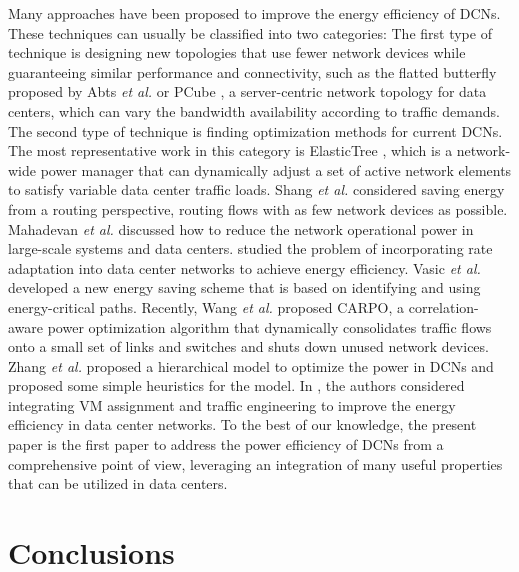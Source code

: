 \documentclass[journal,single-space,two column,twoside,10pt]{IEEEtran}
\begin{document}
Many approaches have been proposed to improve the energy efficiency of DCNs. These techniques can usually be classified into two categories: The first type of technique is designing new topologies that use fewer network devices while guaranteeing similar performance and connectivity, such as the flatted butterfly proposed by Abts \emph{et al.} \cite{Abts_Marty-2010} or PCube \cite{Huang_Jia-2011}, a server-centric network topology for data centers, which can vary the bandwidth availability according to traffic demands. The second type of technique is finding optimization methods for current DCNs. The most representative work in this category is ElasticTree \cite{Heller_Seetharaman-2010}, which is a network-wide power manager that can dynamically adjust a set of active network elements to satisfy variable data center traffic loads. Shang \emph{et al.} \cite{Shang_Li-2010} considered saving energy from a routing perspective, routing flows with as few network devices as possible. Mahadevan \emph{et al.} \cite{Mahadevan_Banerjee-2011} discussed how to reduce the network operational power in large-scale systems and data centers. \cite{Wang_Zhang-NCA-2013} studied the problem of incorporating rate adaptation into data center networks to achieve energy efficiency. Vasic \emph{et al.} \cite{Vasic_Bhurat-2011} developed a new energy saving scheme that is based on identifying and using energy-critical paths. Recently, Wang \emph{et al.} \cite{Wang_Yao-2012} proposed CARPO, a correlation-aware power optimization algorithm that dynamically consolidates traffic flows onto a small set of links and switches and shuts down unused network devices. Zhang \emph{et al.} \cite{Zhang_Ansari-2012} proposed a hierarchical model to optimize the power in DCNs and proposed some simple heuristics for the model. In \cite{Wang_Zhang-Greenmetrics-2013}, the authors considered integrating VM assignment and traffic engineering to improve the energy efficiency in data center networks. To the best of our knowledge, the present paper is the first paper to address the power efficiency of DCNs from a comprehensive point of view, leveraging an integration of many useful properties that can be utilized in data centers.


\section{Conclusions}
\label{sec:conclusion}
\end{document}
